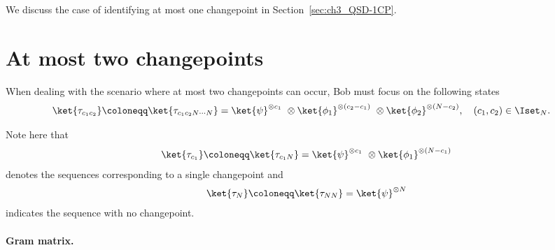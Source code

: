 \begin{appendices}

We discuss the case of identifying at most one changepoint in Section~\ref{sec:ch3_QSD-1CP}.

\section{At most two changepoints}\label{sec:ch3_QSD-2CP}

When dealing with the scenario where at most two changepoints can occur, Bob must focus on the following states
\begin{equation}
    \label{eq:ch3_QSD-2CP}
    \begin{aligned}
        \ket{\tau_{c_1 c_2}} &\coloneqq \ket{\tau_{c_1 c_2 N \cdots N}} = \ket{\psi}^{\otimes c_1}\ \otimes \ket{\phi_1}^{\otimes (c_2 - c_1)}\ \otimes \ket{\phi_2}^{\otimes (N - c_2)}, \quad (c_1, c_2) \in \Iset_N.
    \end{aligned}
\end{equation}

Note here that
\begin{align}
    \ket{\tau_{c_1}} \coloneqq \ket{\tau_{c_1 N}} = \ket{\psi}^{\otimes c_1}\ \otimes \ket{\phi_1}^{\otimes (N - c_1)}
\end{align}
denotes the sequences corresponding to a single changepoint and
\begin{align}
    \ket{\tau_N} \coloneqq \ket{\tau_{N N}} = \ket{\psi}^{\otimes N} 
\end{align}
indicates the sequence with no changepoint.

\paragraph{Gram matrix.}


\end{appendices}
